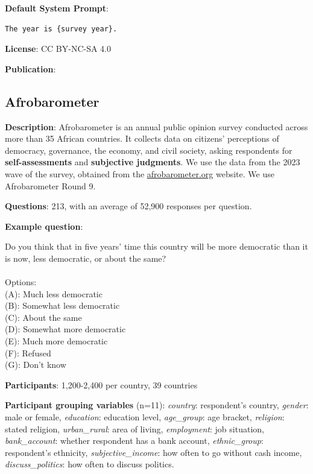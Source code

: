 \documentclass{article} %
\begin{document}
\textbf{Default System Prompt}:
\begin{examplebox}
\begin{Verbatim}[fontfamily=\rmdefault]
The year is {survey year}.
\end{Verbatim}
\end{examplebox}


\textbf{License}: CC BY-NC-SA 4.0

\textbf{Publication}: \cite{ess2024eurosocialsurvey}


\subsection{Afrobarometer}

\textbf{Description}: Afrobarometer is an annual public opinion survey conducted across more than 35 African countries. It collects data on citizens’ perceptions of democracy, governance, the economy, and civil society, asking respondents for \textbf{self-assessments} and \textbf{subjective judgments}. We use the data from the 2023 wave of the survey, obtained from the \href{https://www.afrobarometer.org}{afrobarometer.org} website. We use Afrobarometer Round 9.

\textbf{Questions}: 213, with an average of 52,900 responses per question.

\textbf{Example question}:

\begin{examplebox}
Do you think that in five years’ time this country will be more democratic than it is now, less democratic, or about the same?
\\\\
Options:\\
(A): Much less democratic\\
(B): Somewhat less democratic\\
(C): About the same\\
(D): Somewhat more democratic\\
(E): Much more democratic\\
(F): Refused\\
(G): Don’t know
\end{examplebox}

\textbf{Participants}: 1,200-2,400 per country, 39 countries

\textbf{Participant grouping variables} (n=11):
\textit{country}: respondent’s country,
\textit{gender}: male or female,
\textit{education}: education level,
\textit{age\_group}: age bracket,
\textit{religion}: stated religion,
\textit{urban\_rural}: area of living,
\textit{employment}: job situation,
\textit{bank\_account}: whether respondent has a bank account,
\textit{ethnic\_group}: respondent's ethnicity,
\textit{subjective\_income}: how often to go without cash income,
\textit{discuss\_politics}: how often to discuss politics.
\end{document}
